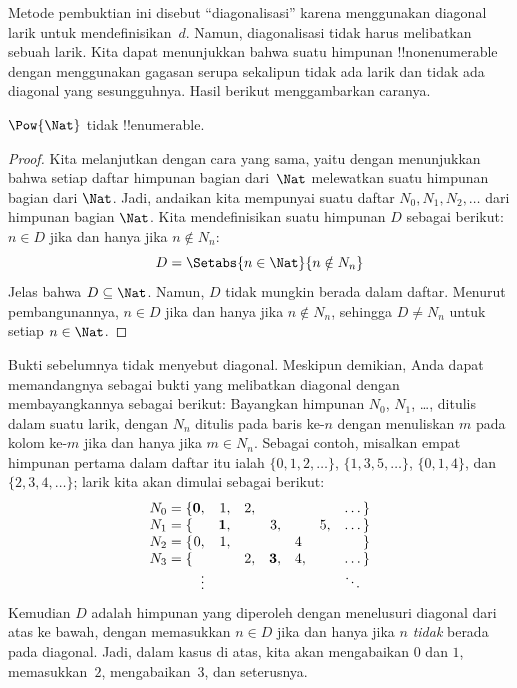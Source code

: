 \documentclass[../../../include/open-logic-section]{subfiles}
\begin{document}
\begin{explain}
Metode pembuktian ini disebut ``diagonalisasi'' karena menggunakan diagonal
larik untuk mendefinisikan~$d$. Namun, diagonalisasi tidak harus melibatkan
sebuah larik. Kita dapat menunjukkan bahwa suatu himpunan !!{nonenumerable}
dengan menggunakan gagasan serupa sekalipun tidak ada larik dan tidak ada
diagonal yang sesungguhnya. Hasil berikut menggambarkan caranya.
\end{explain}

\begin{thm}
$\Pow{\Nat}$ tidak !!{enumerable}.
\end{thm}

\begin{proof}
Kita melanjutkan dengan cara yang sama, yaitu dengan menunjukkan bahwa setiap
daftar himpunan bagian dari~$\Nat$ melewatkan suatu himpunan bagian dari
$\Nat$. Jadi, andaikan kita mempunyai suatu daftar $N_0, N_1, N_2, \ldots$
dari himpunan bagian $\Nat$. Kita mendefinisikan suatu himpunan $D$ sebagai
berikut: $n \in D$ jika dan hanya jika $n \notin N_{n}$:
\[
D = \Setabs{n \in \Nat}{n \notin N_n}
\]
Jelas bahwa $D\subseteq \Nat$. Namun, $D$ tidak mungkin berada dalam daftar.
Menurut pembangunannya, $n \in D$ jika dan hanya jika $n\notin N_n$, sehingga
$D \neq N_n$ untuk setiap $n \in \Nat$.
\end{proof}

\begin{explain}
Bukti sebelumnya tidak menyebut diagonal. Meskipun demikian, Anda dapat
memandangnya sebagai bukti yang melibatkan diagonal dengan membayangkannya
sebagai berikut: Bayangkan himpunan $N_0$, $N_1$, \dots, ditulis dalam suatu
larik, dengan $N_n$ ditulis pada baris ke-$n$ dengan menuliskan $m$ pada kolom
ke-$m$ jika dan hanya jika $m \in N_n$. Sebagai contoh, misalkan empat
himpunan pertama dalam daftar itu ialah $\{0,1,2,\dots\}$, $\{1, 3, 5,
\dots\}$, $\{0,1,4\}$, dan $\{2,3,4,\dots\}$; larik kita akan dimulai sebagai
berikut:
\[
\begin{array}{r@{}rrrrrrr}
  N_0 = \{ & \mathbf{0}, & 1, & 2, & & & & \dots\}\\
  N_1 = \{ &  & \mathbf{1}, &  & 3, &  & 5, & \dots\}\\
  N_2 = \{ & 0, & 1, &  &  & 4\phantom{,} &  & \}\\
  N_3 = \{ &  &  & 2, & \mathbf{3}, & 4, & & \dots\}\\
  &\vdots & & & & & & \ddots\phantom{\}}
  \end{array}
\]
Kemudian $D$ adalah himpunan yang diperoleh dengan menelusuri diagonal dari
atas ke bawah, dengan memasukkan $n \in D$ jika dan hanya jika $n$ \emph{tidak}
berada pada diagonal. Jadi, dalam kasus di atas, kita akan mengabaikan $0$ dan
$1$, memasukkan~$2$, mengabaikan~$3$, dan seterusnya.
\end{explain}
\end{document}
